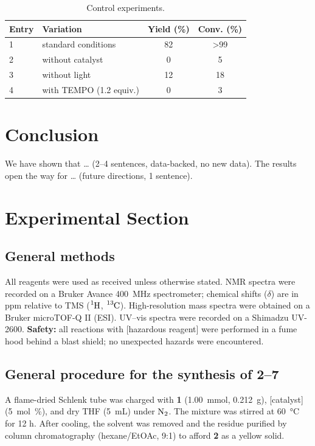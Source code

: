 \documentclass[12pt,a4paper]{article}
\begin{document}
\begin{table}[htbp]
\centering
\caption{Control experiments.}
\label{tab:controls}
\begin{tabular}{llcc}
\toprule
Entry & Variation & Yield (\%) & Conv. (\%) \\
\midrule
1 & standard conditions & 82 & >99 \\
2 & without catalyst & 0 & 5 \\
3 & without light & 12 & 18 \\
4 & with TEMPO (1.2 equiv.) & 0 & 3 \\
\bottomrule
\end{tabular}
\end{table}

\section{Conclusion}
\label{sec:conclusion}

We have shown that \ldots{} (2--4 sentences, data-backed, no new data). The results
open the way for \ldots{} (future directions, 1 sentence).

\section{Experimental Section}
\label{sec:experimental}

\subsection{General methods}
\label{sec:genmethods}
All reagents were used as received unless otherwise stated. NMR spectra were
recorded on a Bruker Avance \SI{400}{\mega\hertz} spectrometer; chemical shifts
($\delta$) are in ppm relative to TMS ($\ce{^1H}$, $\ce{^{13}C}$). High-resolution
mass spectra were obtained on a Bruker microTOF-Q II (ESI). UV--vis spectra were
recorded on a Shimadzu UV-2600. \textbf{Safety:} all reactions with [hazardous
reagent] were performed in a fume hood behind a blast shield; no unexpected
hazards were encountered.

\subsection{General procedure for the synthesis of 2--7}
\label{sec:genproc}
A flame-dried Schlenk tube was charged with \textbf{1} (\SI{1.00}{\milli\mol},
\SI{0.212}{\gram}), [catalyst] (\SI{5}{\mol\percent}), and dry THF
(\SI{5}{\milli\liter}) under $\ce{N2}$. The mixture was stirred at
\SI{60}{\celsius} for 12 h. After cooling, the solvent was removed and the residue
purified by column chromatography (hexane/EtOAc, 9:1) to afford \textbf{2} as a
yellow solid.
\end{document}

